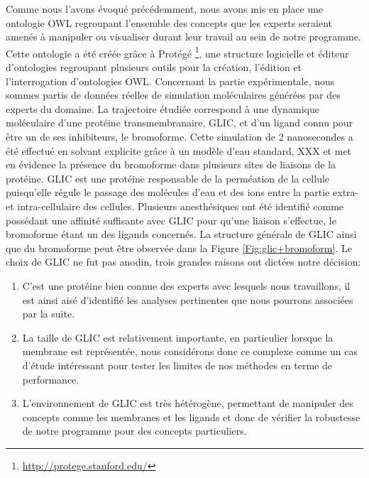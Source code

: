 Comme nous l'avons évoqué précédemment, nous avons mis en place une ontologie OWL regroupant l'ensemble des concepts que les experts seraient amenés à manipuler ou visualiser durant leur travail au sein de notre programme. Cette ontologie a été créée grâce à Protégé \footnote{\url{http://protege.stanford.edu/}}, une structure logicielle et éditeur d'ontologies regroupant plusieurs outils pour la création, l'édition et l'interrogation d'ontologies OWL.
Concernant la partie expérimentale, nous sommes partis de données réelles de simulation moléculaires générées par des experts du domaine. La trajectoire étudiée correspond à une dynamique moléculaire d'une protéine transmembranaire, GLIC, et d'un ligand connu pour être un de ses inhibiteurs, le bromoforme. Cette simulation de 2 nanosecondes a été effectué en solvant explicite grâce à un modèle d'eau standard, XXX et met en évidence la présence du bromoforme dans plusieurs sites de liaisons de la protéine. GLIC est une protéine responsable de la perméation de la cellule puisqu'elle régule le passage des molécules d'eau et des ions entre la partie extra- et intra-cellulaire des cellules. Plusieurs anesthésiques ont été identifié comme possédant une affinité suffisante avec GLIC pour qu'une liaison s'effectue, le bromoforme étant un des ligands concernés. La structure générale de GLIC ainsi que du bromoforme peut être observée dans la Figure \ref{Fig:glic+bromoform}. Le choix de GLIC ne fut pas anodin, trois grandes raisons ont dictées notre décision:
\begin{enumerate}
	\item C'est une protéine bien connue des experts avec lesquels nous travaillons, il est ainsi aisé d'identifié les analyses pertinentes que nous pourrons associées par la suite.
	\item La taille de GLIC est relativement importante, en particulier lorsque la membrane est représentée, nous considérons donc ce complexe comme un cas d'étude intéressant pour tester les limites de nos méthodes en terme de performance.
	\item L'environnement de GLIC est très hétérogène, permettant de manipuler des concepts comme les membranes et les ligands et donc de vérifier la robustesse de notre programme pour des concepts particuliers.
\end{enumerate}


